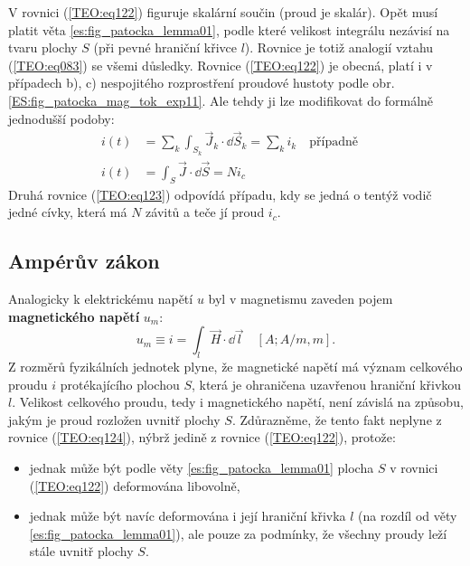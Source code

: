         V rovnici (\ref{TEO:eq122}) figuruje skalární součin (proud je skalár). Opět musí 
        platit věta \ref{es:fig_patocka_lemma01}, podle které velikost integrálu nezávisí na tvaru 
        plochy \(S\) (při pevné hraniční křivce \(l\)). Rovnice je totiž analogií vztahu 
        (\ref{TEO:eq083}) se všemi důsledky. Rovnice (\ref{TEO:eq122}) je obecná, 
        platí i v případech b), c) nespojitého rozprostření proudové hustoty podle obr. 
        \ref{ES:fig_patocka_mag_tok_exp11}. Ale tehdy ji lze modifikovat do formálně jednodušší 
        podoby:
        \begin{align}
          i(t) &= \sum_k\int_{S_k}\vec{J}_k\cdot \dd{\vec{S}}_k = \sum_k i_k 
                  \quad\text{případně}\quad                         \nonumber \\
          i(t) &= \int_S\vec{J}\cdot \dd{\vec{S}} = Ni_c                  \label{TEO:eq123}
        \end{align} 
        Druhá rovnice (\ref{TEO:eq123}) odpovídá případu, kdy se jedná o tentýž vodič jedné 
        cívky, která má \(N\) závitů a teče jí proud \(i_c\).
      
      \subsection{Ampérův zákon}
        Analogicky k elektrickému napětí \(u\) byl v magnetismu zaveden pojem \textbf{magnetického 
        napětí} \(u_m\):
        \begin{equation}\label{TEO:eq124}
          u_m \equiv i = \int_l \vec{H}\cdot \dd{\vec{l}} \quad [A; A/m, m].
        \end{equation} 
        Z rozměrů fyzikálních jednotek plyne, že magnetické napětí má význam celkového proudu \(i\) 
        protékajícího plochou \(S\), která je ohraničena uzavřenou hraniční křivkou \(l\). Velikost 
        celkového proudu, tedy i magnetického napětí, není závislá na způsobu, jakým je proud 
        rozložen uvnitř plochy \(S\). Zdůrazněme, že tento fakt neplyne z rovnice 
        (\ref{TEO:eq124}), nýbrž jedině z rovnice (\ref{TEO:eq122}), protože:
        \begin{itemize}         
          \item jednak může být podle věty \ref{es:fig_patocka_lemma01} plocha \(S\) v rovnici 
                (\ref{TEO:eq122}) deformována libovolně,
          \item jednak může být navíc deformována i její hraniční křivka \(l\) (na rozdíl od věty 
                \ref{es:fig_patocka_lemma01}), ale pouze za podmínky, že všechny proudy leží stále 
                uvnitř plochy \(S\).
        \end{itemize}
        
